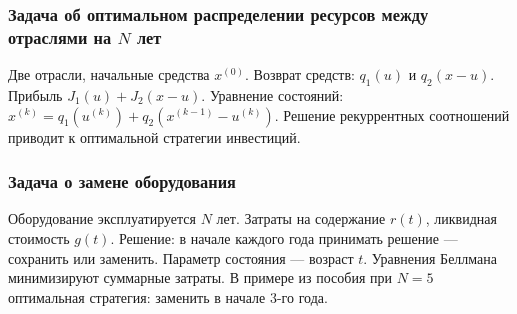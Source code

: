 \documentclass{article}
\theoremstyle{plain}
\begin{document}
\subsubsection{Задача об оптимальном распределении ресурсов между отраслями на $N$ лет}
Две отрасли, начальные средства $x^{(0)}$. Возврат средств: $q_1(u)$ и $q_2(x-u)$. Прибыль $J_1(u)+J_2(x-u)$. Уравнение состояний: $x^{(k)} = q_1(u^{(k)}) + q_2(x^{(k-1)}-u^{(k)})$. Решение рекуррентных соотношений приводит к оптимальной стратегии инвестиций.

\subsubsection{Задача о замене оборудования}
Оборудование эксплуатируется $N$ лет. Затраты на содержание $r(t)$, ликвидная стоимость $g(t)$. Решение: в начале каждого года принимать решение — сохранить или заменить. Параметр состояния — возраст $t$. Уравнения Беллмана минимизируют суммарные затраты. В примере из пособия при $N=5$ оптимальная стратегия: заменить в начале 3-го года.
\end{document}
